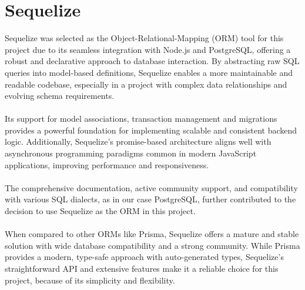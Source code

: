 \documentclass[a4paper,12pt]{report}
\begin{document}
\section{Sequelize}
Sequelize was selected as the Object-Relational-Mapping (ORM) tool for this project due to its seamless integration with Node.js and PostgreSQL, offering a robust and declarative approach to database interaction. By abstracting raw SQL queries into model-based definitions, Sequelize enables a more maintainable and readable codebase, especially in a project with complex data relationships and evolving schema requirements.\\\\
Its support for model associations, transaction management and migrations provides a powerful foundation for implementing scalable and consistent backend logic. Additionally, Sequelize's promise-based architecture aligns well with asynchronous programming paradigms common in modern JavaScript applications, improving performance and responsiveness. \parencite{sequelizegit}\\\\
The comprehensive documentation, active community support, and compatibility with various SQL dialects, as in our case PostgreSQL, further contributed to the decision to use Sequelize as the ORM in this project.\\\\
When compared to other ORMs like Prisma, Sequelize offers a mature and stable solution with wide database compatibility and a strong community. While Prisma provides a modern, type-safe approach with auto-generated types, Sequelize's straightforward API and extensive features make it a reliable choice for this project, because of its simplicity and flexibility. \parencite{Ormcomparemedium} \parencite{Ormcomparedhiwise} \\
\end{document}
